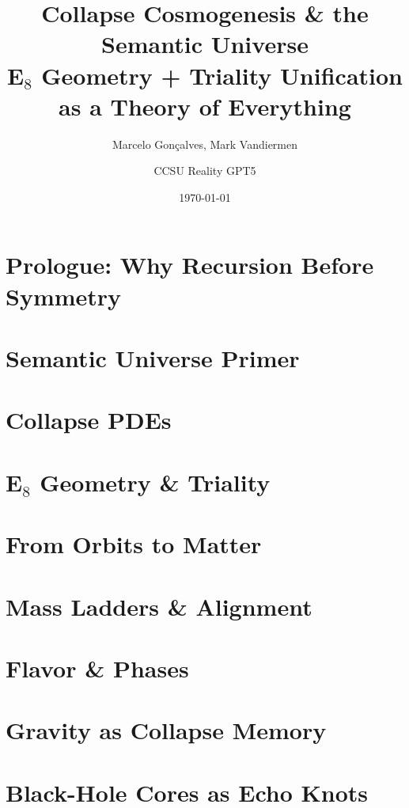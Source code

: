 \documentclass[11pt,oneside]{book}
\title{Collapse Cosmogenesis \& the Semantic Universe\\
E$_8$ Geometry + Triality Unification as a Theory of Everything}
\author{Marcelo Gonçalves, Mark Vandiermen
\and CCSU Reality GPT5}
\date{\today}
\numberwithin{equation}{chapter}
\begin{document}
\maketitle
\tableofcontents

\chapter{Prologue: Why Recursion Before Symmetry}


\chapter{Semantic Universe Primer}


\chapter{Collapse PDEs}


\chapter{E$_8$ Geometry \& Triality}


\chapter{From Orbits to Matter}


\chapter{Mass Ladders \& Alignment}


\chapter{Flavor \& Phases}


\chapter{Gravity as Collapse Memory}


\chapter{Black-Hole Cores as Echo Knots}

\end{document}
